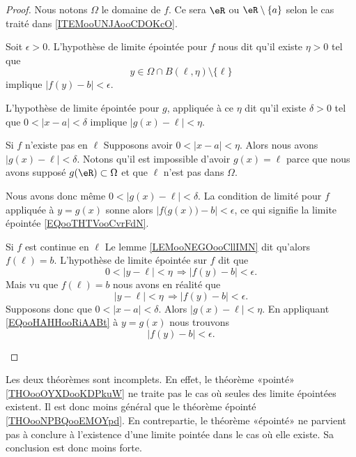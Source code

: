 \begin{proof}
	Nous notons \( \Omega\) le domaine de \( f\). Ce sera \( \eR\) ou \( \eR\setminus\{ a \}\) selon le cas traité dans \ref{ITEMooUNJAooCDOKcO}.

	Soit \( \epsilon>0\). L'hypothèse de limite épointée pour \( f\) nous dit qu'il existe \( \eta>0\) tel que
	\begin{equation}
		y\in\Omega\cap B(\ell,\eta)\setminus\{ \ell \}
	\end{equation}
	implique \( | f(y)-b |<\epsilon\).

	L'hypothèse de limite épointée pour \( g\), appliquée à ce \( \eta\) dit qu'il existe \( \delta>0\) tel que \( 0<| x-a |<\delta\) implique \( | g(x)-\ell |<\eta\).

	\begin{subproof}
		\item[Si \( f\) n'existe pas en \( \ell\)]
		Supposons avoir \( 0<| x-a |<\eta\). Alors nous avons \( | g(x)-\ell |<\delta\). Notons qu'il est impossible d'avoir \( g(x)=\ell\) parce que nous avons supposé \( g(\eR)\subset \Omega\) et que \( \ell\) n'est pas dans \( \Omega\).

		Nous avons donc même \( 0<| g(x)-\ell |<\delta\). La condition de limité pour \( f\) appliquée à \( y=g(x)\) sonne alors \( | f\big( g(x) \big)-b |<\epsilon\), ce qui signifie la limite épointée \eqref{EQooTHTVooCvrFdN}.
		\item[Si \( f\) est continue en \( \ell\)]
		Le lemme \ref{LEMooNEGOooCllIMN} dit qu'alors \( f(\ell)=b\). L'hypothèse de limite épointée sur \( f\) dit que
		\begin{equation}
			0<| y-\ell |<\eta\,\Rightarrow | f(y)-b |<\epsilon.
		\end{equation}
		Mais vu que \( f(\ell)=b\) nous avons en réalité que
		\begin{equation}        \label{EQooHAHHooRiAABt}
			| y-\ell |<\eta\,\Rightarrow | f(y)-b |<\epsilon.
		\end{equation}
		Supposons donc que \( 0<|x-a  |<\delta\). Alors \( | g(x)-\ell |<\eta\). En appliquant \eqref{EQooHAHHooRiAABt} à \( y=g(x)\) nous trouvons
		\begin{equation}
			| f(y)-b |<\epsilon.
		\end{equation}
	\end{subproof}
\end{proof}

\begin{normaltext}      \label{NORMooSLAJooLfDreV}
	Les deux théorèmes sont incomplets. En effet, le théorème «pointé» \ref{THOooOYXDooKDPkuW} ne traite pas le cas où seules des limite épointées existent. Il est donc moins général que le théorème épointé \ref{THOooNPBQooEMOYpd}. En contrepartie, le théorème «épointé» ne parvient pas à conclure à l'existence d'une limite pointée dans le cas où elle existe. Sa conclusion est donc moins forte.
\end{normaltext}

